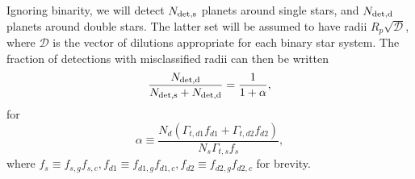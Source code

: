 \documentclass{emulateapj}
\begin{document}
Ignoring binarity, we will detect $N_{\rm det,s}$ planets around single stars, 
and $N_{\rm det,d}$ planets around double stars. The latter set will be assumed 
to have radii $R_p \sqrt{\mathcal{D}}$, where $\mathcal{D}$ is the vector of 
dilutions appropriate for each binary star system.
The fraction of detections with misclassified radii can then be written
\begin{equation}
\frac{N_{\rm det,d}}{N_{\rm det,s} + N_{\rm det,d}} = \frac{1}{1+\alpha},
\end{equation}
for
\begin{equation}
\alpha \equiv 
\frac{ N_d (\Gamma_{t,d1} f_{d1} + \Gamma_{t,d2} f_{d2}) }{N_s \Gamma_{t,s} 
f_s},
\end{equation}
where $f_s \equiv f_{s,g}f_{s,c}, f_{d1} \equiv f_{d1,g}f_{d1,c}, 
f_{d2} \equiv f_{d2,g}f_{d2,c}$ for brevity.
\end{document}
